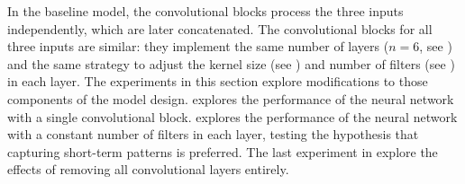 
In the baseline model, the convolutional blocks process the
three inputs independently, which are later concatenated.
The convolutional blocks for all three inputs are similar:
they implement the same number of layers ($n=6$, see
) and the same
strategy to adjust the kernel size (see
) and number of filters (see
) in each layer. The
experiments in this section explore modifications to those
components of the model design.
 explores the
performance of the neural network with a single
convolutional block. 
explores the performance of the neural network with a
constant number of filters in each layer, testing the
hypothesis that capturing short-term patterns is preferred.
The last experiment in 
explore the effects of removing all convolutional layers
entirely.
